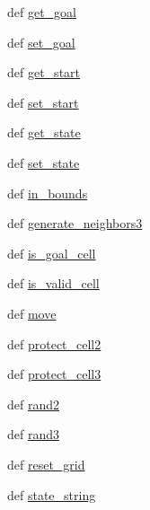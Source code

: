 \begin{DoxyCompactItemize}
\item 
def \hyperlink{classoctile__grid_1_1_octile_grid_ac9f34a67c39f96451d06fa7cb547d0bf}{get\+\_\+goal}
\item 
def \hyperlink{classoctile__grid_1_1_octile_grid_aab90075971471ea70f18e546d4c6b34d}{set\+\_\+goal}
\item 
def \hyperlink{classoctile__grid_1_1_octile_grid_a0bb935250e283ab73d99af97f3068d66}{get\+\_\+start}
\item 
def \hyperlink{classoctile__grid_1_1_octile_grid_a8733538e09d16af0a14a1723a7c355ac}{set\+\_\+start}
\item 
def \hyperlink{classoctile__grid_1_1_octile_grid_a6d1e38cffc73cd53f445289011ecc908}{get\+\_\+state}
\item 
def \hyperlink{classoctile__grid_1_1_octile_grid_ac5454f5a87b174d917d6454eea98db7a}{set\+\_\+state}
\item 
def \hyperlink{classoctile__grid_1_1_octile_grid_aab69066988100d239b8301cc2469ecba}{in\+\_\+bounds}
\item 
def \hyperlink{classoctile__grid_1_1_octile_grid_abc7b93f2206970157a545e92a858a3b7}{generate\+\_\+neighbors3}
\item 
def \hyperlink{classoctile__grid_1_1_octile_grid_ac525bbcb3e97bef1add66569bd8e1cd6}{is\+\_\+goal\+\_\+cell}
\item 
def \hyperlink{classoctile__grid_1_1_octile_grid_a1eeb405a4c850e93fe86e4251f65b0ae}{is\+\_\+valid\+\_\+cell}
\item 
def \hyperlink{classoctile__grid_1_1_octile_grid_aeed0b8f125ad0ffede7e29c0d4ef293e}{move}
\item 
def \hyperlink{classoctile__grid_1_1_octile_grid_abbe0f861bb4f0688c8f1c53b65ca1509}{protect\+\_\+cell2}
\item 
def \hyperlink{classoctile__grid_1_1_octile_grid_afc02e9f41ac8e352766d0e8f7bc6c33b}{protect\+\_\+cell3}
\item 
def \hyperlink{classoctile__grid_1_1_octile_grid_ad996c459612fb606505f3e5e4d6ca806}{rand2}
\item 
def \hyperlink{classoctile__grid_1_1_octile_grid_a1b5dcbda2f375437cd36b709b8516b00}{rand3}
\item 
def \hyperlink{classoctile__grid_1_1_octile_grid_a20c3066c3cb658be0056f206c886d73c}{reset\+\_\+grid}
\item 
def \hyperlink{classoctile__grid_1_1_octile_grid_a07890f6b7f51095fe1fc6eb6ea7cc557}{state\+\_\+string}
\end{DoxyCompactItemize}
